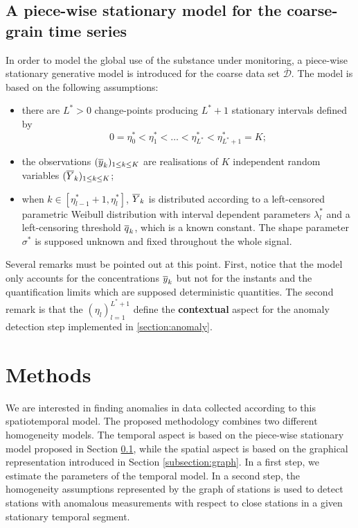 \subsection{A piece-wise stationary model for the coarse-grain time series}\label{subsection:pwsm}
In order to model the global use of the substance under monitoring, a piece-wise stationary generative model is introduced for the coarse data set $\overline{\mathcal{D}}$. The model is based on the following assumptions:
\begin{itemize}
    \item there are $L^*>0$ change-points producing $L^*+1$ stationary intervals defined by
\begin{equation*}
0=\eta_0^*<\eta_1^*<\ldots<\eta_{L^*}^*<\eta^*_{L^*+1}=K;    
\end{equation*}    
    \item the observations $(\overline{y}_k)_{1\leq k\leq K}$ are realisations of $K$ independent random variables $(\overline{Y}_k)_{1\leq k\leq K}$;
    \item when $k\in [\eta^*_{l-1}+1, \eta^*_{l}]$, $\overline{Y}_k$ is distributed according to a left-censored parametric Weibull distribution with interval dependent parameters $\lambda^*_l$ and a left-censoring threshold $\overline{q}_k$, which is a known constant. The shape parameter $\sigma^*$ is supposed unknown and fixed throughout the whole signal. 
\end{itemize}
Several remarks must be pointed out at this point. First, notice that the model only accounts for the concentrations $\overline{y}_k$ but not for the instants and the quantification limits which are supposed deterministic quantities. The second remark is that the $(\eta_l)_{l=1}^{L^*+1}$ define the \textbf{contextual} aspect for the anomaly detection step implemented in \ref{section:anomaly}.  

\section{Methods}\label{section:methods}

We are interested in finding anomalies in data collected according to this spatiotemporal model. The proposed methodology combines two different homogeneity models. The temporal aspect is based on the piece-wise stationary model proposed in Section \ref{subsection:pwsm}, while the spatial aspect is based on the graphical representation introduced in Section \ref{subsection:graph}. In a first step, we estimate the parameters of the temporal model. In a second step, the homogeneity assumptions represented by the graph of stations is used to detect stations with anomalous measurements with respect to close stations in a given stationary temporal segment. 

